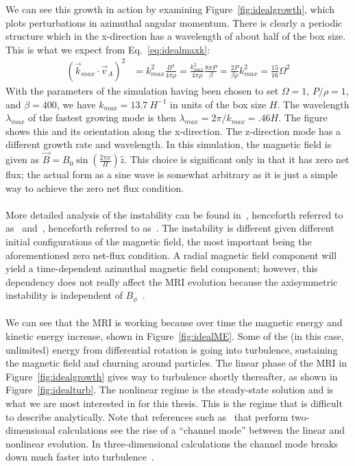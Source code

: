 We can see this growth in action by examining Figure~\ref{fig:idealgrowth}, which plots perturbations in azimuthal angular momentum. There is clearly a periodic structure which in the x-direction has a wavelength of about half of the box size. This is what we expect from Eq.~\ref{eq:idealmaxk}:
\begin{align*}
  (\vec k_{max}\cdot \vec v_A)^2&=k_{max}^2\frac{B^2}{4\pi\rho}=\frac{k_{max}^2}{4\pi\rho}\frac{8\pi P}{\beta}=\frac{2P}{\beta\rho}k_{max}^2=\frac{15}{16}\Omega^2
\end{align*}
With the parameters of the simulation having been chosen to set $\Omega=1$, $P/\rho=1$, and $\beta=400$, we have $k_{max}=13.7~H^{-1}$ in units of the box size $H$. The wavelength $\lambda_{max}$ of the fastest growing mode is then $\lambda_{max}=2\pi/k_{max}=.46H$. The figure shows this and its orientation along the x-direction. The z-direction mode has a different growth rate and wavelength. In this simulation, the magnetic field is given as $\vec B=B_0\sin\left(\frac{2\pi x}H\right)\hat z$. This choice is significant only in that it has zero net flux; the actual form as a sine wave is somewhat arbitrary as it is just a simple way to achieve the zero net flux condition.\\
\\
More detailed analysis of the instability can be found in~\cite{BH1991a}, henceforth referred to as~ and~\cite{BH1998}, henceforth referred to as~. The instability is different given different initial configurations of the magnetic field, the most important being the aforementioned zero net-flux condition. A radial magnetic field component will yield a time-dependent azimuthal magnetic field component; however, this dependency does not really affect the MRI evolution because the axisymmetric instability is independent of $B_\phi$~\cite{BH1998}. \\
\\
We can see that the MRI is working because over time the magnetic energy and kinetic energy increase, shown in Figure~\ref{fig:idealME}. Some of the (in this case, unlimited) energy from differential rotation is going into turbulence, sustaining the magnetic field and churning around particles. The linear phase of the MRI in Figure~\ref{fig:idealgrowth} gives way to turbulence shortly thereafter, as shown in Figure~\ref{fig:idealturb}. The nonlinear regime is the steady-state solution and is what we are most interested in for this thesis. This is the regime that is difficult to describe analytically. Note that references such as~ that perform two-dimensional calculations see the rise of a ``channel mode'' between the linear and nonlinear evolution. In three-dimensional calculations the channel mode breaks down much faster into turbulence~\cite{HGB1995,HGB1996}.\\
